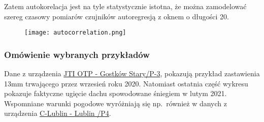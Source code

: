 Zatem autokorelacja jest na tyle statystycznie istotna, że można zamodelować szereg czasowy pomiarów czujników autoregresją z oknem o długości 20.
\begin{figure}[H]
    \texttt{[image: autocorrelation.png]}
    \label{fig:autocorrelation}
\end{figure}

\subsubsection{Omówienie wybranych przykładów}

Dane z urządzenia \hyperref[fig:example812]{JTI OTP - Gostków Stary/P-3}, pokazują przykład zastawienia 13mm trwającego przez wrzesień roku 2020.
Natomiast ostatnia część wykresu pokazuje faktyczne ugięcie dachu spowodowane śniegiem w lutym 2021.
Wspomniane warunki pogodowe wyróżniają się np.\ również w danych z urządzenia \hyperref[fig:example201]{C-Lublin - Lublin /P4}.


